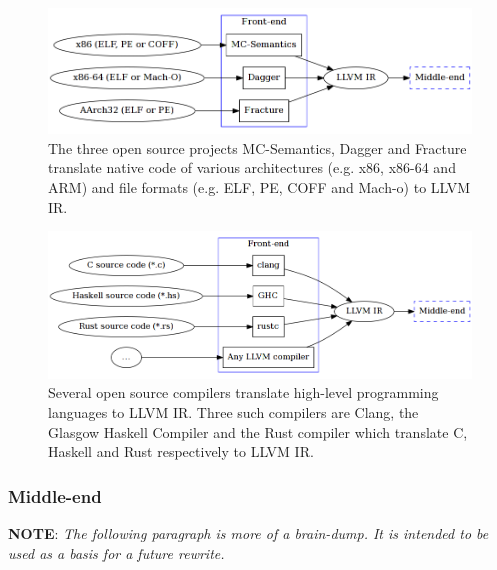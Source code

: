 
\begin{figure}[htbp]
	\begin{center}
		\includegraphics[width=\textwidth]{inc/front-end_binary.png}
		\caption{The three open source projects MC-Semantics, Dagger and Fracture translate native code of various architectures (e.g. x86, x86-64 and ARM) and file formats (e.g. ELF, PE, COFF and Mach-o) to LLVM IR.}
		\label{fig:front-end_binary}
	\end{center}
\end{figure}

\begin{figure}[htbp]
	\begin{center}
		\includegraphics[width=\textwidth]{inc/front-end_source.png}
		\caption{Several open source compilers translate high-level programming languages to LLVM IR. Three such compilers are Clang, the Glasgow Haskell Compiler and the Rust compiler which translate C, Haskell and Rust respectively to LLVM IR.}
		\label{fig:front-end_source}
	\end{center}
\end{figure}

\subsubsection{Middle-end}


\textbf{NOTE}: \textit{The following paragraph is more of a brain-dump. It is intended to be used as a basis for a future rewrite.}

